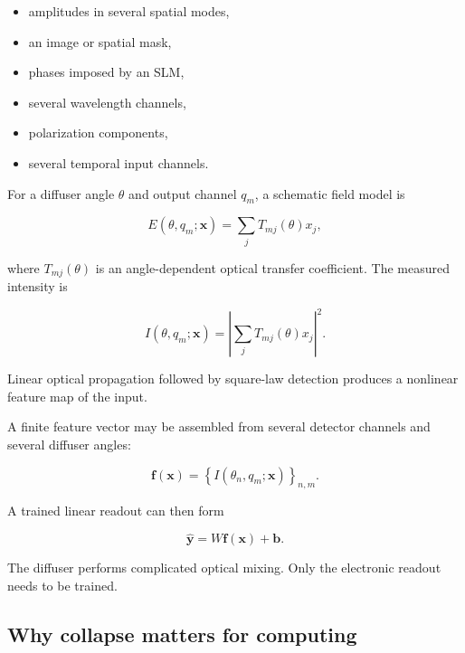 \documentclass[11pt,letterpaper]{article}
\begin{document}
\begin{itemize}[leftmargin=2em]
    \item amplitudes in several spatial modes,
    \item an image or spatial mask,
    \item phases imposed by an SLM,
    \item several wavelength channels,
    \item polarization components,
    \item several temporal input channels.
\end{itemize}

For a diffuser angle $\theta$ and output channel $q_m$, a schematic field
model is

\begin{equation}
    E(\theta,q_m;\bm{x})
    =
    \sum_j T_{mj}(\theta)x_j,
\end{equation}

where $T_{mj}(\theta)$ is an angle-dependent optical transfer coefficient.
The measured intensity is

\begin{equation}
    I(\theta,q_m;\bm{x})
    =
    \left|
    \sum_j T_{mj}(\theta)x_j
    \right|^2.
    \label{eq:intensity_feature}
\end{equation}

Linear optical propagation followed by square-law detection produces a
nonlinear feature map of the input.

A finite feature vector may be assembled from several detector channels and
several diffuser angles:

\begin{equation}
    \bm{f}(\bm{x})
    =
    \left\{
    I(\theta_n,q_m;\bm{x})
    \right\}_{n,m}.
    \label{eq:feature_vector}
\end{equation}

A trained linear readout can then form

\begin{equation}
    \widehat{\bm{y}}
    =
    W\bm{f}(\bm{x})+\bm{b}.
\end{equation}

The diffuser performs complicated optical mixing. Only the electronic
readout needs to be trained.

\subsection{Why collapse matters for computing}
\end{document}
